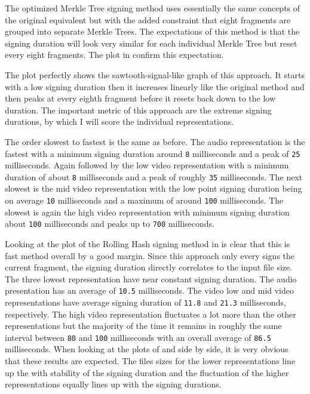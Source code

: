 The optimized Merkle Tree signing method uses essentially the same concepts of the original equivalent but with the added constraint that eight fragments are grouped into separate Merkle Trees. The expectations of this method is that the signing duration will look very similar for each individual Merkle Tree but reset every eight fragments. The plot in  confirm this expectation.

The plot perfectly shows the sawtooth-signal-like graph of this approach. It starts with a low signing duration then it increases linearly like the original method and then peaks at every eighth fragment before it resets back down to the low duration. The important metric of this approach are the extreme signing durations, by which I will score the individual representations.

The order slowest to fastest is the same as before. The audio representation is the fastest with a minimum signing duration around \texttt{8} milliseconds and a peak of \texttt{25} milliseconds. Again followed by the low video representation with a minimum duration of about \texttt{8} milliseconds and a peak of roughly \texttt{35} milliseconds. The next slowest is the mid video representation with the low point signing duration being on average \texttt{10} milliseconds and a maximum of around \texttt{100} milliseconds. The slowest is again the high video representation with minimum signing duration about \texttt{100} milliseconds and peaks up to \texttt{700} milliseconds.

Looking at the plot of the Rolling Hash signing method in  is clear that this is fast method overall by a good margin. Since this approach only every signs the current fragment, the signing duration directly correlates to the input file size. The three lowest representation have near constant signing duration. The audio presentation has an average of \texttt{10.5} milliseconds. The video low and mid video representations have average signing duration of \texttt{11.8} and \texttt{21.3} milliseconds, respectively. The high video representation fluctuates a lot more than the other representations but the majority of the time it remains in roughly the same interval between \texttt{80} and \texttt{100} milliseconds with an overall average of \texttt{86.5} milliseconds. When looking at the plots of  and  side by side, it is very obvious that these results are expected. The files sizes for the lower representations line up the with stability of the signing duration and the fluctuation of the higher representations equally lines up with the signing durations.

